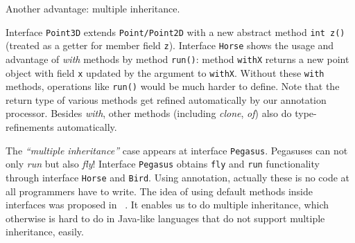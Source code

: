 Another advantage: multiple inheritance.







Interface \texttt{Point3D} extends \texttt{Point/Point2D} with a new abstract
method \texttt{int z()} (treated as a getter for member field
\texttt{z}). Interface \texttt{Horse} shows the usage and advantage of
\emph{with} methods by method \texttt{run()}: method \texttt{withX} returns a
new point object with field \texttt{x} updated by the argument to
\texttt{withX}. Without these \texttt{with} methods, operations like
\texttt{run()} would be much harder to define. Note that the return type of
various methods get refined automatically by our annotation processor. Besides
\emph{with}, other methods (including \emph{clone}, \emph{of}) also do
type-refinements automatically.

The \emph{``multiple inheritance''} case appears at interface
\texttt{Pegasus}. Pegasuses can not only \emph{run} but also \emph{fly}!
Interface \texttt{Pegasus} obtains \texttt{fly} and \texttt{run} functionality
through interface \texttt{Horse} and \texttt{Bird}. Using \mixin annotation,
actually these is no code at all programmers have to write. The idea of using
default methods inside interfaces was proposed in ~\cite{}. It enables us to do
multiple inheritance, which otherwise is hard to do in Java-like languages that
do not support multiple inheritance, easily.
